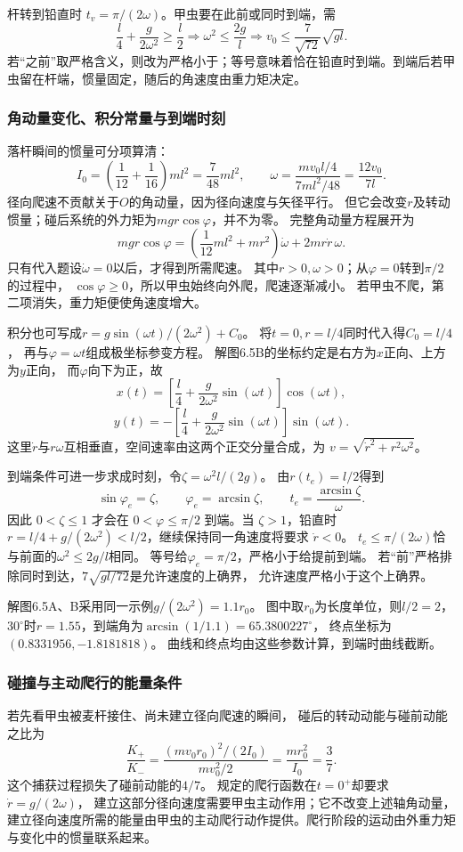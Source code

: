 \documentclass[UTF8,fontset=fandol,a4paper,11pt]{ctexart}
\newcommand{\result}[1]{\begin{equation*}\boxed{#1}\end{equation*}}
\begin{document}
杆转到铅直时 $t_v=\pi/(2\omega)$。甲虫要在此前或同时到端，需
\[
 \frac l4+\frac g{2\omega^2}\ge\frac l2
 \Longrightarrow \omega^2\le\frac{2g}{l}
 \Longrightarrow\result{v_0\le\frac7{\sqrt{72}}\sqrt{gl}.}
\]
若“之前”取严格含义，则改为严格小于；等号意味着恰在铅直时到端。到端后若甲虫留在杆端，惯量固定，随后的角速度由重力矩决定。
\subsubsection*{角动量变化、积分常量与到端时刻}
落杆瞬间的惯量可分项算清：
\[
I_0=\left(\frac1{12}+\frac1{16}\right)ml^2
=\frac7{48}ml^2,
\qquad
\omega=\frac{mv_0l/4}{7ml^2/48}=\frac{12v_0}{7l}.
\]
径向爬速不贡献关于$O$的角动量，因为径向速度与矢径平行。
但它会改变$r$及转动惯量；碰后系统的外力矩为$mgr\cos\varphi$，并不为零。
完整角动量方程展开为
\[
mgr\cos\varphi
=\left(\frac1{12}ml^2+mr^2\right)\dot\omega
+2mr\dot r\,\omega.
\]
只有代入题设$\dot\omega=0$以后，才得到所需爬速。
其中$r>0,\omega>0$；从$\varphi=0$转到$\pi/2$的过程中，
$\cos\varphi\geq0$，所以甲虫始终向外爬，爬速逐渐减小。
若甲虫不爬，第二项消失，重力矩便使角速度增大。

积分也可写成$r=g\sin(\omega t)/(2\omega^2)+C_0$。
将$t=0,r=l/4$同时代入得$C_0=l/4$，
再与$\varphi=\omega t$组成极坐标参变方程。
解图6.5B的坐标约定是右方为$x$正向、上方为$y$正向，
而$\varphi$向下为正，故
\[
x(t)=\left[\frac l4+\frac g{2\omega^2}\sin(\omega t)\right]\cos(\omega t),
\]
\[
y(t)=-\left[\frac l4+\frac g{2\omega^2}\sin(\omega t)\right]\sin(\omega t).
\]
这里$\dot r$与$r\omega$互相垂直，空间速率由这两个正交分量合成，为 $v=\sqrt{\dot r^2+r^2\omega^2}$。

到端条件可进一步求成时刻，令$\zeta=\omega^2l/(2g)$。
由$r(t_e)=l/2$得到
\[
\sin\varphi_e=\zeta,
\qquad \varphi_e=\arcsin\zeta,
\qquad t_e=\frac{\arcsin\zeta}{\omega}.
\]
因此 $0<\zeta\leq1$ 才会在 $0<\varphi\leq\pi/2$ 到端。当 $\zeta>1$，铅直时 $r=l/4+g/(2\omega^2)<l/2$，继续保持同一角速度将要求 $\dot r<0$。
$t_e\leq\pi/(2\omega)$恰与前面的$\omega^2\leq2g/l$相同。
等号给$\varphi_e=\pi/2$，严格小于给提前到端。
若“前”严格排除同时到达，$7\sqrt{gl/72}$是允许速度的上确界，
允许速度严格小于这个上确界。

解图6.5A、B采用同一示例$g/(2\omega^2)=1.1r_0$。
图中取$r_0$为长度单位，则$l/2=2$，
$30^\circ$时$r=1.55$，到端角为$\arcsin(1/1.1)=65.3800227^\circ$，
终点坐标为$(0.8331956,-1.8181818)$。
曲线和终点均由这些参数计算，到端时曲线截断。

\subsubsection*{碰撞与主动爬行的能量条件}
若先看甲虫被麦杆接住、尚未建立径向爬速的瞬间，
碰后的转动动能与碰前动能之比为
\[
\frac{K_+}{K_-}
=\frac{(mv_0r_0)^2/(2I_0)}{mv_0^2/2}
=\frac{mr_0^2}{I_0}=\frac37.
\]
这个捕获过程损失了碰前动能的$4/7$。
规定的爬行函数在$t=0^+$却要求$\dot r=g/(2\omega)$，
建立这部分径向速度需要甲虫主动作用；它不改变上述轴角动量，
建立径向速度所需的能量由甲虫的主动爬行动作提供。爬行阶段的运动由外重力矩与变化中的惯量联系起来。
\end{document}
